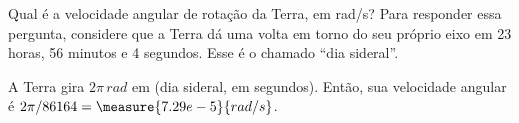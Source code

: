\begin{question}
    Qual é a velocidade angular de rotação da Terra, em \unit{rad/s}?
    Para responder essa pergunta, considere que a Terra dá uma volta em torno do seu próprio eixo em 23 horas, 56 minutos e 4 segundos.
    Esse é o chamado ``dia sideral''.

    \begin{answer}
    \end{answer}

    \begin{solution}
      A Terra gira $2\pi\,\unit{rad}$ em  (dia sideral, em segundos).
      Então, sua velocidade angular é $2\pi/86164 = \measure{7.29e-5}{rad/s}$.
    \end{solution}
\end{question}